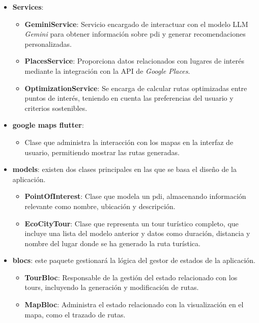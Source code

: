 \begin{itemize}
	\item \textbf{Services}:
	\begin{itemize}
		\item \textbf{GeminiService}: Servicio encargado de interactuar con el modelo LLM \textit{Gemini} para obtener información sobre \acrlong{pdi} y generar recomendaciones personalizadas.
		\item \textbf{PlacesService}: Proporciona datos relacionados con lugares de interés mediante la integración con la API de \textit{Google Places}.
		\item \textbf{OptimizationService}: Se encarga de calcular rutas optimizadas entre puntos de interés, teniendo en cuenta las preferencias del usuario y criterios sostenibles.
	\end{itemize}
	
	\item \textbf{google maps flutter}:
	\begin{itemize}
		\item Clase que administra la interacción con los mapas en la interfaz de usuario, permitiendo mostrar las rutas generadas.
	\end{itemize}
	
	\item \textbf{models}: existen dos clases principales en las que se basa el diseño de la aplicación.
	\begin{itemize}
		\item \textbf{PointOfInterest}: Clase que modela un \acrlong{pdi}, almacenando información relevante como nombre, ubicación y descripción. 
		\item \textbf{EcoCityTour}: Clase que representa un tour turístico completo, que incluye una lista del modelo anterior y datos como duración, distancia y nombre del lugar donde se ha generado la ruta turística.
	\end{itemize}
	
	\item \textbf{blocs}: este paquete gestionará la lógica del gestor de estados de la aplicación.
	\begin{itemize}
		\item \textbf{TourBloc}: Responsable de la gestión del estado relacionado con los tours, incluyendo la generación y modificación de rutas.
		\item \textbf{MapBloc}: Administra el estado relacionado con la visualización en el mapa, como el trazado de rutas.
	\end{itemize}
	

\end{itemize}
